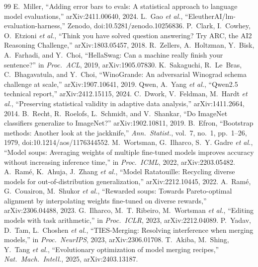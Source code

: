 \documentclass[conference]{IEEEtran}
\begin{document}
\begin{thebibliography}{99}
 E.~Miller, ``Adding error bars to evals: A statistical approach to language model evaluations,'' arXiv:2411.00640, 2024.
 L.~Gao \emph{et al.}, ``EleutherAI/lm-evaluation-harness,'' Zenodo, doi:10.5281/zenodo.10256836.
 P.~Clark, I.~Cowhey, O.~Etzioni \emph{et al.}, ``Think you have solved question answering? Try ARC, the AI2 Reasoning Challenge,'' arXiv:1803.05457, 2018.
 R.~Zellers, A.~Holtzman, Y.~Bisk, A.~Farhadi, and Y.~Choi, ``HellaSwag: Can a machine really finish your sentence?'' in \emph{Proc.\ ACL}, 2019, arXiv:1905.07830.
 K.~Sakaguchi, R.~Le~Bras, C.~Bhagavatula, and Y.~Choi, ``WinoGrande: An adversarial Winograd schema challenge at scale,'' arXiv:1907.10641, 2019.
 Qwen, A.~Yang \emph{et al.}, ``Qwen2.5 technical report,'' arXiv:2412.15115, 2024.
 C.~Dwork, V.~Feldman, M.~Hardt \emph{et al.}, ``Preserving statistical validity in adaptive data analysis,'' arXiv:1411.2664, 2014.
 B.~Recht, R.~Roelofs, L.~Schmidt, and V.~Shankar, ``Do ImageNet classifiers generalize to ImageNet?'' arXiv:1902.10811, 2019.
 B.~Efron, ``Bootstrap methods: Another look at the jackknife,'' \emph{Ann.\ Statist.}, vol.~7, no.~1, pp.~1--26, 1979, doi:10.1214/aos/1176344552.
 M.~Wortsman, G.~Ilharco, S.~Y. Gadre \emph{et al.}, ``Model soups: Averaging weights of multiple fine-tuned models improves accuracy without increasing inference time,'' in \emph{Proc.\ ICML}, 2022, arXiv:2203.05482.
 A.~Ram\'e, K.~Ahuja, J.~Zhang \emph{et al.}, ``Model Ratatouille: Recycling diverse models for out-of-distribution generalization,'' arXiv:2212.10445, 2022.
 A.~Ram\'e, G.~Couairon, M.~Shukor \emph{et al.}, ``Rewarded soups: Towards Pareto-optimal alignment by interpolating weights fine-tuned on diverse rewards,'' arXiv:2306.04488, 2023.
 G.~Ilharco, M.~T. Ribeiro, M.~Wortsman \emph{et al.}, ``Editing models with task arithmetic,'' in \emph{Proc.\ ICLR}, 2023, arXiv:2212.04089.
 P.~Yadav, D.~Tam, L.~Choshen \emph{et al.}, ``TIES-Merging: Resolving interference when merging models,'' in \emph{Proc.\ NeurIPS}, 2023, arXiv:2306.01708.
 T.~Akiba, M.~Shing, Y.~Tang \emph{et al.}, ``Evolutionary optimization of model merging recipes,'' \emph{Nat.\ Mach.\ Intell.}, 2025, arXiv:2403.13187.

\end{thebibliography}
\end{document}
